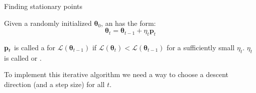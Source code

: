 \documentclass[12pt,aspectratio=169]{beamer}
\newcommand{\eqnmarkbox}[3][]{#3}
\newcommand{\annotate}[4][]{}
\begin{document}
\begin{frame}{Finding stationary points}


	\begin{tcolorbox}

		Given a randomly initialized $\boldsymbol{\theta}_0$, an  has the form:
		\begin{equation}
			\boldsymbol{\theta}_t = \eqnmarkbox[drawred]{node}{\boldsymbol{\theta}_{t-1}} + \eqnmarkbox[drawblue]{node2}{\eta_t\mathbf{p}_t}
			\label{eq:iterative_descent}
			\annotate[yshift=1em]{above,left}{node}{Guess at iteration $t$}
			\annotate[yshift=-1em]{below,left}{node2}{Displacement at iteration $t$}
		\end{equation}
	\end{tcolorbox}

	$\boldsymbol{\mathbf{p}}_t$ is called a  for $\mathcal{L}(\boldsymbol{\theta}_{t-1})$ if $\mathcal{L}(\boldsymbol{\theta}_t) < \mathcal{L}(\boldsymbol{\theta}_{t-1})$ for a sufficiently small $\eta_t$. $\eta_t$ is called  or .

	To implement this iterative algorithm we need a way to choose a descent direction (and a step size) for all $t$.

\end{frame}
\end{document}
